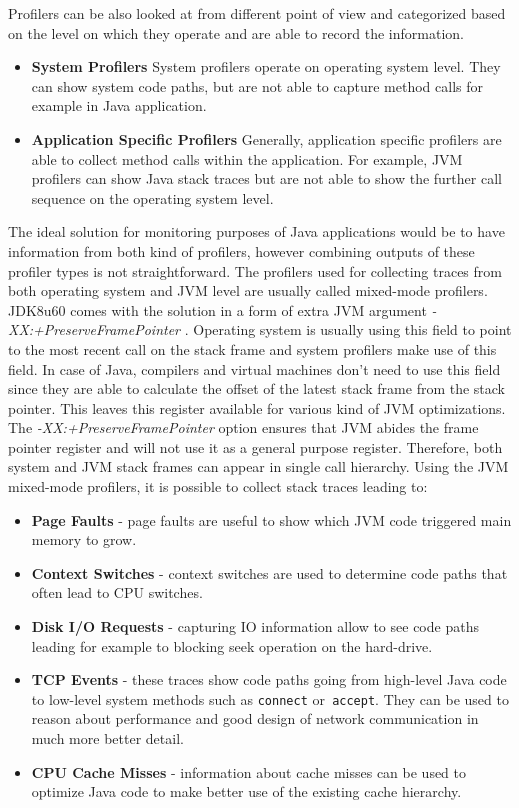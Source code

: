Profilers can be also looked at from different point of view and categorized based on the level on which they operate and are able to record the information.
\begin{itemize}
	\item \textbf{System Profilers} \newline
	System profilers operate on operating system level. They can show system code paths, but are not able to capture method calls for example in Java application.
	\item \textbf{Application Specific Profilers} \newline
	Generally, application specific profilers are able to collect method calls within the application. For example, JVM profilers can show Java stack traces but are not able to show the further call sequence on the operating system level.

\end{itemize}
The ideal solution for monitoring purposes of Java applications would be to have information from both kind of profilers, however combining outputs of these profiler types is not straightforward. The profilers used for collecting traces from both operating system and JVM level are usually called mixed-mode profilers. JDK8u60 comes with the solution in a form of extra JVM argument \textit{-XX:+PreserveFramePointer} \cite{MixedModeProfilers}. Operating system is usually using this field to point to the most recent call on the stack frame and system profilers make use of this field. In case of Java, compilers and virtual machines don't need to use this field since they are able to calculate the offset of the latest stack frame from the stack pointer. This leaves this register available for various kind of JVM optimizations. The \textit{-XX:+PreserveFramePointer}  option ensures that JVM abides the frame pointer register and will not use it as a general purpose register. Therefore, both system and JVM stack frames can appear in single call hierarchy. Using the JVM mixed-mode profilers, it is possible to collect stack traces leading to:
\begin{itemize}
	\item \textbf{Page Faults} - page faults are useful to show which JVM code triggered main memory to grow.
	\item \textbf{Context Switches} - context switches are used to determine code paths that often lead to CPU switches.
	\item\textbf{Disk I/O Requests} - capturing IO information allow to see code paths leading for example to blocking seek operation on the hard-drive.
	\item \textbf{TCP Events} - these traces show code paths going from high-level Java code to low-level system methods such as \texttt{connect} or\texttt{ accept}. They can be used to reason about performance and good design of network communication in much more better detail.
	\item \textbf{CPU Cache Misses} - information about cache misses can be used to optimize Java code to make better use of the existing cache hierarchy.
\end{itemize}


